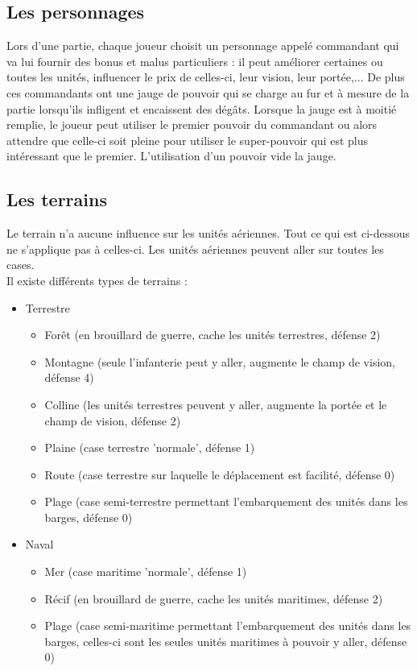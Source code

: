 \documentclass[a4paper,10pt]{article} %
\begin{document}
\subsection{Les personnages}
Lors d'une partie, chaque joueur choisit un personnage appelé commandant qui va lui fournir des bonus et malus particuliers : il peut améliorer certaines ou toutes les unités, influencer le prix de celles-ci, leur vision, leur portée,... De plus ces commandants ont une jauge de pouvoir qui se charge au fur et à mesure de la partie lorsqu'ils infligent et encaissent des dégâts. Lorsque la jauge est à moitié remplie, le joueur peut utiliser le premier pouvoir du commandant ou alors attendre que celle-ci soit pleine pour utiliser le super-pouvoir qui est plus intéressant que le premier. L'utilisation d'un pouvoir vide la jauge.

\subsection{Les terrains}
Le terrain n'a aucune influence sur les unités aériennes. Tout ce qui est ci-dessous ne s'applique pas à celles-ci. Les unités aériennes peuvent aller sur toutes les cases.\\

Il existe différents types de terrains :

\begin{itemize}
\item Terrestre
\begin{itemize}
\item Forêt (en brouillard de guerre, cache les unités terrestres, défense 2)
\item Montagne (seule l'infanterie peut y aller, augmente le champ de vision, défense 4)
\item Colline (les unités terrestres peuvent y aller, augmente la portée et le champ de vision, défense 2)
\item Plaine (case terrestre 'normale', défense 1)
\item Route (case terrestre sur laquelle le déplacement est facilité, défense 0)
\item Plage (case semi-terrestre permettant l'embarquement des unités dans les barges, défense 0)
\end{itemize}
\item Naval
\begin{itemize}
\item Mer (case maritime 'normale', défense 1)
\item Récif (en brouillard de guerre, cache les unités maritimes, défense 2)
\item Plage (case semi-maritime permettant l'embarquement des unités dans les barges, celles-ci sont les seules unités maritimes à pouvoir y aller, défense 0)
\end{itemize}
\end{itemize}
\end{document}
